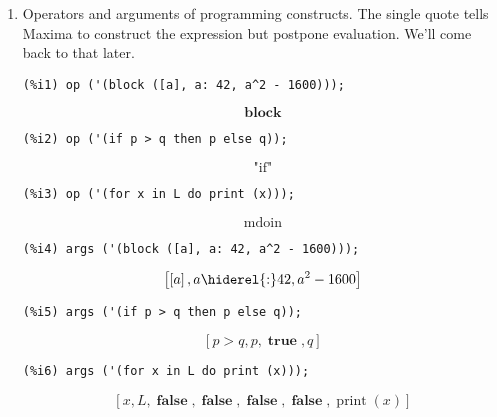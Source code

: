 \documentclass[12pt,leqno]{article}
\begin{document}
\begin{enumerate}
\item Operators and arguments of programming constructs.
The single quote tells Maxima to construct the expression but postpone evaluation.
We'll come back to that later.
\begin{verbatim}
(%i1) op ('(block ([a], a: 42, a^2 - 1600)));
\end{verbatim}
\begin{dmath}[number={\(\mathop{\mathrm{\%o}_{1}}\)}]
\mathop{\mathbf{block}}
\end{dmath}
\begin{verbatim}
(%i2) op ('(if p > q then p else q));
\end{verbatim}
\begin{dmath}[number={\(\mathop{\mathrm{\%o}_{2}}\)}]
\mbox{"if"}
\end{dmath}
\begin{verbatim}
(%i3) op ('(for x in L do print (x)));
\end{verbatim}
\begin{dmath}[number={\(\mathop{\mathrm{\%o}_{3}}\)}]
\mathop{\mathrm{mdoin}}
\end{dmath}
\begin{verbatim}
(%i4) args ('(block ([a], a: 42, a^2 - 1600)));
\end{verbatim}
\begin{dmath}[number={\(\mathop{\mathrm{\%o}_{4}}\)}]
\left[\left[a\right], a \hiderel{:} 42, {a}^{2}-1600\right]
\end{dmath}
\begin{verbatim}
(%i5) args ('(if p > q then p else q));
\end{verbatim}
\begin{dmath}[number={\(\mathop{\mathrm{\%o}_{5}}\)}]
\left[p > q, p, \mathop{\mathbf{true}}, q\right]
\end{dmath}
\begin{verbatim}
(%i6) args ('(for x in L do print (x)));
\end{verbatim}
\begin{dmath}[number={\(\mathop{\mathrm{\%o}_{6}}\)}]
\left[x, L, \mathop{\mathbf{false}}, \mathop{\mathbf{false}}, \mathop{\mathbf{false}}, \mathop{\mathbf{false}}, \mathop{\mathrm{print}}\left(x\right)\right]
\end{dmath}


\end{enumerate}
\end{document}

